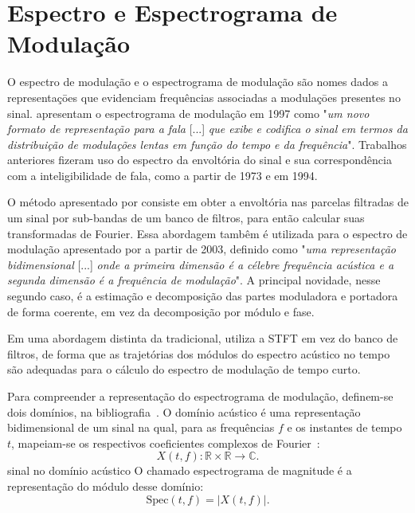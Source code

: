\section{Espectro e Espectrograma de Modulação}

O espectro de modulação e o espectrograma de modulação são nomes dados a
representaçōes que evidenciam frequências associadas a modulaçōes presentes no
sinal. \citet{greenberg1997} apresentam o espectrograma de modulação em 1997
como "\textit{um novo formato de representação para a fala} [...] \textit{que
exibe e codifica o sinal em termos da distribuição de modulações lentas em
função do tempo e da frequência}". Trabalhos anteriores fizeram uso do espectro
da envoltória do sinal e sua correspondência com a inteligibilidade de fala,
como \citet{houtgast1973} \citet{houtgast1980} \cite{houtgast1985} a partir de 1973 e \citet{drullman1994} em 1994.

O método apresentado por \citet{greenberg1997} consiste em obter a envoltória
nas parcelas filtradas de um sinal por sub-bandas de um banco de filtros, para
então calcular suas transformadas de Fourier. Essa abordagem tambêm é utilizada
para o espectro de modulação apresentado por \citet{atlas2004} \cite{atlas2003}
a partir de 2003, definido como "\textit{uma representação bidimensional} [...]
\textit{onde a primeira dimensão é a célebre frequência acústica e a segunda
dimensão é a frequência de modulação}". A principal novidade, nesse segundo
caso, é a estimação e decomposição das partes moduladora e portadora de forma
coerente, em vez da decomposição por módulo e fase.

Em uma abordagem distinta da tradicional,
\citet{paliwal2010}\cite{so2011modulation}\cite{paliwal2012mmse} utiliza a STFT 
em vez do banco de filtros, de forma que as trajetórias dos módulos do espectro
acústico no tempo são adequadas para o cálculo do espectro de modulação de tempo
curto.

Para compreender a representação do espectrograma de modulação, definem-se dois
domínios, na bibliografia~\cite{paliwal2015}. O domínio acústico é uma
representação bidimensional de um sinal na qual, para as frequências $f$ e os
instantes de tempo $t$, mapeiam-se os respectivos coeficientes complexos de
Fourier~\cite{muller2015}:
\begin{equation}
X(t, f): \mathbb{R}  \times  \mathbb{R} \rightarrow \mathbb{C}.
\end{equation}{sinal no domínio acústico}
O chamado espectrograma de  magnitude é a representação do módulo desse domínio:
\begin{equation}
\mathrm{Spec}(t, f) = \left\lvert X(t, f)\right\rvert.
\end{equation}

